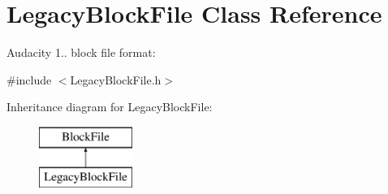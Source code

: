 \hypertarget{class_legacy_block_file}{}\section{Legacy\+Block\+File Class Reference}
\label{class_legacy_block_file}


Audacity 1.. block file format\+:  




{\ttfamily \#include $<$Legacy\+Block\+File.\+h$>$}

Inheritance diagram for Legacy\+Block\+File\+:\begin{figure}[H]
\begin{center}
\leavevmode
\includegraphics[height=2.000000cm]{class_legacy_block_file}
\end{center}
\end{figure}
